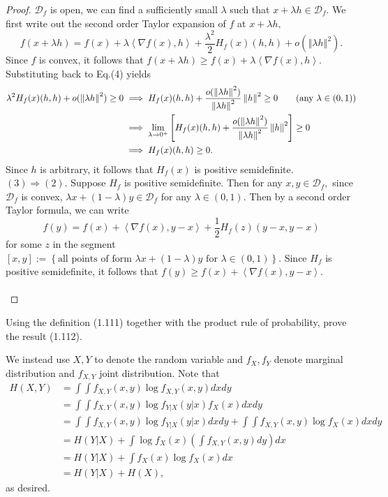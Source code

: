 \begin{proof}
$\mathcal{D}_{f}$ is open, we can find a sufficiently small $\lambda$
such that $x+\lambda h\in\mathcal{D}_{f}$. We first write out the
second order Taylor expansion of $f$ at $x+\lambda h,$ 
\[
f(x+\lambda h)=f(x)+\lambda\left\langle \nabla f(x),h\right\rangle +\frac{\lambda^{2}}{2}H_{f}(x)(h,h)+o(\left\Vert \lambda h\right\Vert ^{2}).\tag{4}
\]
Since $f$ is convex, it follows that $f(x+\lambda h)\geq f(x)+\lambda\left\langle \nabla f(x),h\right\rangle $.
Substituting back to Eq.(4) yields 
\begin{align*}
\lambda^{2}H_{f}(x)(h,h)+o(\left\Vert \lambda h\right\Vert ^{2})\geq0 & \implies H_{f}(x)(h,h)+\frac{o(\left\Vert \lambda h\right\Vert ^{2})}{\left\Vert \lambda h\right\Vert ^{2}}\left\Vert h\right\Vert ^{2}\geq0\tag{any \ensuremath{\lambda\in(0,1)}}\\
 & \implies\lim_{\lambda\rightarrow0^{+}}\left[H_{f}(x)(h,h)+\frac{o(\left\Vert \lambda h\right\Vert ^{2})}{\left\Vert \lambda h\right\Vert ^{2}}\left\Vert h\right\Vert ^{2}\right]\geq0\\
 & \implies H_{f}(x)(h,h)\geq0.
\end{align*}
Since $h$ is arbitrary, it follows that $H_{f}(x)$ is positive semidefinite.
\medskip\\
$(3)\Rightarrow(2).$ Suppose $H_{f}$ is positive semidefinite. Then
for any $x,y\in\mathcal{D}_{f},$ since $\mathcal{D}_{f}$ is convex,
$\lambda x+(1-\lambda)y\in\mathcal{D}_{f}$ for any $\lambda\in(0,1).$
Then by a second order Taylor formula, we can write 
\[
f(y)=f(x)+\left\langle \nabla f(x),y-x\right\rangle +\frac{1}{2}H_{f}(z)(y-x,y-x)
\]
for some $z$ in the segment $\left[x,y\right]:=\left\{ \text{all points of form }\lambda x+(1-\lambda)y\text{ for }\lambda\in(0,1)\right\} $.
Since $H_{f}$ is positive semidefinite, it follows that $f(y)\geq f(x)+\left\langle \nabla f(x),y-x\right\rangle .$
\\
\\
\end{proof}
%
\begin{cBoxA}{}
 Using the definition (1.111) together with the product rule of probability,
prove the result (1.112).
\end{cBoxA}

We instead use $X,Y$ to denote the random variable and $f_{X},f_{Y}$
denote marginal distribution and $f_{X,Y}$ joint distribution. Note
that 
\begin{align*}
H(X,Y) & =\int\int f_{X,Y}(x,y)\log f_{X,Y}(x,y)dxdy\\
 & =\int\int f_{X,Y}(x,y)\log f_{Y|X}(y\vert x)f_{X}(x)dxdy\\
 & =\int\int f_{X,Y}(x,y)\log f_{Y\vert X}(y|x)dxdy+\int\int f_{X,Y}(x,y)\log f_{X}(x)dxdy\\
 & =H(Y\vert X)+\int\log f_{X}(x)\left(\int f_{X,Y}(x,y)dy\right)dx\\
 & =H(Y\vert X)+\int f_{X}(x)\log f_{X}(x)dx\\
 & =H(Y\vert X)+H(X),
\end{align*}
as desired.\\

